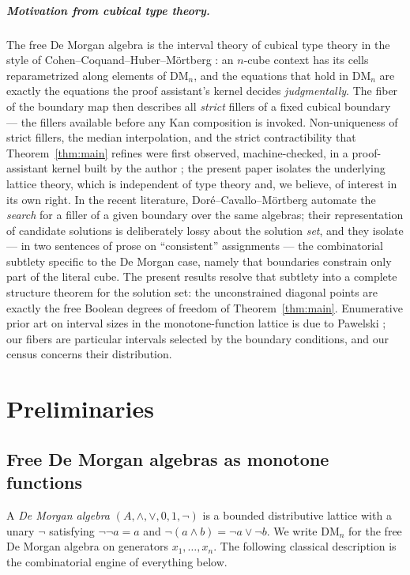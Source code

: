 \documentclass[11pt]{amsart}
\theoremstyle{definition}
\newcommand{\DM}{\mathrm{DM}}
\begin{document}
\subparagraph*{Motivation from cubical type theory.}  The free De
Morgan algebra is the interval theory of cubical type theory in the
style of Cohen--Coquand--Huber--M\"ortberg \cite{CCHM}: an $n$-cube
context has its cells reparametrized along elements of $\DM_n$, and
the equations that hold in $\DM_n$ are exactly the equations the
proof assistant's kernel decides \emph{judgmentally}.  The fiber of
the boundary map then describes all \emph{strict} fillers of a fixed
cubical boundary --- the fillers available before any Kan composition
is invoked.  Non-uniqueness of strict fillers, the median
interpolation, and the strict contractibility that
Theorem~\ref{thm:main} refines were first observed, machine-checked,
in a proof-assistant kernel built by the author
\cite{Const,Convexity}; the present paper isolates the underlying
lattice theory, which is independent of type theory and, we believe,
of interest in its own right.  In the recent literature,
Dor\'e--Cavallo--M\"ortberg \cite{DCM} automate the \emph{search} for
a filler of a given boundary over the same algebras; their
representation of candidate solutions is deliberately lossy about
the solution \emph{set}, and they isolate --- in two sentences of
prose on ``consistent'' assignments \cite[\S4.3]{DCM} --- the
combinatorial subtlety specific to the De Morgan case, namely that
boundaries constrain only part of the literal cube.  The present
results resolve that subtlety into a complete structure theorem for
the solution set: the unconstrained diagonal points are exactly the
free Boolean degrees of freedom of Theorem~\ref{thm:main}.
Enumerative prior art on interval sizes in the monotone-function
lattice is due to Pawelski \cite{Pawelski}; our fibers are particular
intervals selected by the boundary conditions, and our census
concerns their distribution.

\section{Preliminaries}
\label{sec:prelim}

\subsection{Free De Morgan algebras as monotone functions}

A \emph{De Morgan algebra} $(A, \wedge, \vee, 0, 1, \neg)$ is a
bounded distributive lattice with a unary $\neg$ satisfying
$\neg\neg a = a$ and $\neg(a \wedge b) = \neg a \vee \neg b$.  We
write $\DM_n$ for the free De Morgan algebra on generators
$x_1, \dots, x_n$.  The following classical description is the
combinatorial engine of everything below.
\end{document}
